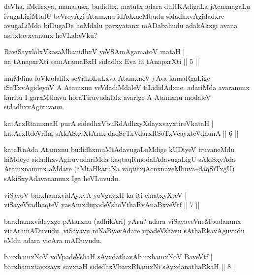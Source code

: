 \begin{artha}
deVha, iMdirxya, manasusx, budidhx, matutx adara duHKAdigaLa jAcnxnagaLu ivugaLigiMtalU beVreyAgi Atamxnu idAdxneMbudu sidadhxvAgidadxre avugaLiMda biDugaDe hoMdalu parxyatanx mADabahudu adakAkxgi avana asitxtavxvanunx heVLabeVku?
\end{artha}


\begin{shl}
BaviSayxlolxVkasaMbanidhxV yeVSAmAgamatoV mataH |\\
na tAnapxrXti samAramaBxH sidadhx Eva hi tAnapxrXti \hfill || 5 ||
\end{shl}

\begin{artha}
muMdina loVkadalilx seVrikoLuLxva AtamxneV yAva kamaRgaLige iSaTxvAgideyoV A Atamxnu veVdadiMdaleV tiLididAdxne. adariMda avaranunx kuritu I garxMthavu horaTiruvudalalx avarige A Atamxnu modaleV sidadhxvAgiruvanu.
\end{artha}

\begin{shl}
katArxRtamxnaH purA sidedhxVbuRdAdhxyXdayxvayxtireVkataH |\\
katArxRdeVriha sAkASxyXtAmx daqSeTxVdarxRSoTxVcayxteV\s dhunA \hfill || 6 ||
\end{shl}

\begin{artha}
kataRnAda Atamxnu budidhxmuMtAdavugaLoMdige kUDiyeV iruvaneMdu hiMdeye sidadhxvAgiruvudariMda kaqtaqRmodalAdavugaLigU sAkiSxyAda Atamxnanunx aMdare (aMtaHkaraNa vaqtitxjAcnxnaveMbuva--daqSiTxgU) sAkiSxyAdavananunx Iga heVLuvudu.
\end{artha}

\begin{shl}
viSayoV barxhamxvidAyxyA yoVgayxH ka iti cinatxyXteV |\\
viSayeV\s vadhaqteV yasAmxdupadeVshoV\s thaRvAnaBxveVtf \hfill || 7 ||
\end{shl}

\begin{artha}
barxhamxvideyxge pAtarxnu (adhikAri) yAru? adara viSayaveVneMbudanunx vicAramADuvudu. viSayavu niNaRyavAdare upadeVshavu sAthaRkavAguvudu eMdu adara vicAra mADuvudu.
\end{artha}


\begin{shl}
barxhamxNoV voVpadeVshaH sAyxdathavA\s barxhamxNoV BaveVtf |\\
barxhamxtavxsayx savxtaH sidedhxVbarxRhamxNi sAyxdanathaRkaH \hfill || 8 ||
\end{shl}

